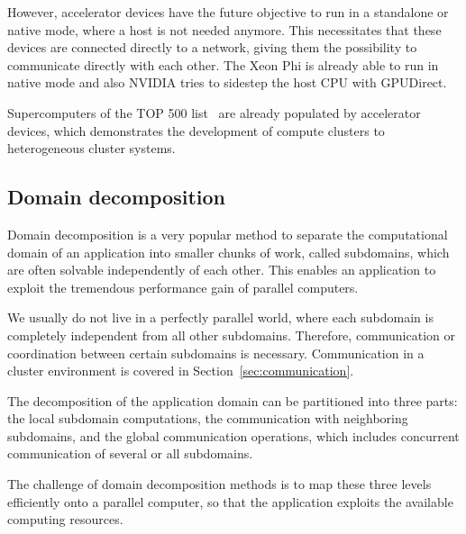 However, accelerator devices have the future objective to run in a
standalone or native mode, where a host is not needed anymore.  This necessitates
that these devices are connected directly to a network,
giving them the possibility to communicate directly with each
other. The Xeon Phi is already able to run in native mode and
also NVIDIA tries to sidestep the host CPU with GPUDirect.

Supercomputers of the TOP 500 list~\cite{ref:top500} are already
populated by accelerator devices, which demonstrates the development
of compute clusters to heterogeneous cluster systems.


\subsection{Domain decomposition}
\label{sec:domain_decomposition}
Domain decomposition is a very popular method to separate the
computational domain of an application into smaller chunks of work,
called subdomains, which are often solvable independently of each
other. This enables an application to exploit the tremendous
performance gain of parallel computers.

We usually do not live in a perfectly parallel world, where each
subdomain is completely independent from all other subdomains.
Therefore, communication or coordination between certain subdomains is
necessary. Communication in a cluster environment is covered in
Section~\ref{sec:communication}.

The decomposition of the application domain can be partitioned into
three parts: the local subdomain computations, the communication with
neighboring subdomains, and the global communication operations, which
includes concurrent communication of several or all subdomains.

The challenge of domain decomposition methods is to map these three
levels efficiently onto a parallel computer, so that the application
exploits the available computing resources.


